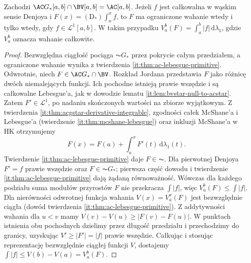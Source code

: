 \begin{twierdzenie}\label{it:thm:denjoy-bv-ac}
Zachodzi $\AC G_*[a,b]\cap\BV[a,b]=\AC[a,b]$.
Jeżeli $f$ jest całkowalna w wąskim sensie Denjoya i
$F(x)=(\mathrm D_*)\int_a^x f$, to $F$ ma ograniczone wahanie wtedy i tylko wtedy, gdy $f\in\mathcal L^1[a,b]$.
W takim przypadku $V_a^b(F)=\int_a^b|f|\,\mathrm d\lambda_1$, gdzie $V_a^b$ oznacza wahanie całkowite.
\end{twierdzenie}
\begin{proof}
Bezwzględna ciągłość pociąga $\AC G_*$ przez pokrycie całym przedziałem, a ograniczone wahanie wynika z twierdzenia \ref{it:thm:ac-lebesgue-primitive}.
Odwrotnie, niech $F\in\AC G_*\cap\BV$. Rozkład Jordana przedstawia $F$ jako różnicę dwóch niemalejących funkcji. Ich pochodne istnieją prawie wszędzie i są całkowalne Lebesgue'a, jak w dowodzie lematu \ref{it:lem:bvstar-null-to-acstar}. Zatem $F'\in\mathcal L^1$, po nadaniu skończonych wartości na zbiorze wyjątkowym.
Z twierdzenia \ref{it:thm:acgstar-derivative-integrable}, zgodności całek McShane'a i Lebesgue'a (twierdzenie \ref{it:thm:mcshane-lebesgue}) oraz inkluzji McShane'a w HK otrzymujemy
\[
 F(x)=F(a)+\int_a^x F'(t)\,\mathrm d\lambda_1(t).
\]
Twierdzenie \ref{it:thm:ac-lebesgue-primitive} daje $F\in\AC$.
Dla pierwotnej Denjoya $F'=f$ prawie wszędzie oraz $F\in\AC G_*$; pierwsza część dowodu i twierdzenie \ref{it:thm:ac-lebesgue-primitive} dają żądaną równoważność.
Wówczas dla każdego podziału suma modułów przyrostów $F$ nie przekracza $\int|f|$, więc $V_a^b(F)\le\int|f|$.
Dla nierówności odwrotnej funkcja wahania $V(x)=V_a^x(F)$ jest bezwzględnie ciągła (dowód twierdzenia \ref{it:thm:ac-lebesgue-primitive}). Z addytywności wahania dla $u<v$ mamy $V(v)-V(u)\ge|F(v)-F(u)|$. W punktach istnienia obu pochodnych dzielimy przez długość przedziału i przechodzimy do granicy, uzyskując $V'\ge|F'|=|f|$ prawie wszędzie.
Całkując i stosując reprezentację bezwzględnie ciągłej funkcji $V$, dostajemy $\int|f|\le V(b)-V(a)=V_a^b(F)$.
\end{proof}

